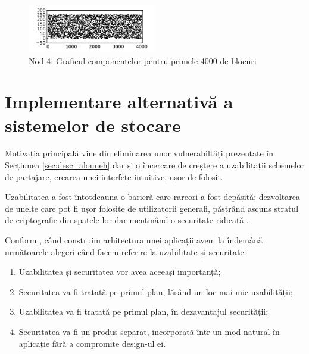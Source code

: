\documentclass[oneside, 12pt]{book}
\begin{document}
\begin{figure}[t!]
\begin{center}
\includegraphics[width=0.5\textwidth]{img/carouri_db4_c.png}    %
\caption{Nod 4: Graficul componentelor pentru primele 4000 de blocuri} 
\label{fig:carouri_db4_c}
\end{center}
\end{figure}





\chapter{Implementare alternativă a sistemelor de stocare}
\label{cha:alternave-implementations}


Motivația principală vine din eliminarea unor vulnerabiltăți prezentate în Secțiunea  \ref{sec:desc_alouneh} dar și o încercare de creștere a uzabilității schemelor de partajare, crearea unei interfețe intuitive, ușor de folosit.

Uzabilitatea a fost întotdeauna o barieră care rareori a fost depășită; dezvoltarea de unelte care pot fi ușor folosite de utilizatorii generali, păstrând ascuns stratul de criptografie din spatele lor dar menținând o securitate ridicată \cite{gutmann:2005security}.

Conform \cite{gutmann:2005security}, când construim arhitectura unei aplicații avem la îndemână următoarele alegeri când facem referire la uzabilitate și securitate:

\begin{enumerate}
\item Uzabilitatea și securitatea vor avea aceeași importanță; 
\item Securitatea va fi tratată pe primul plan, lăsând un loc mai mic uzabilității;
\item Uzabilitatea va fi tratată pe primul plan, în dezavantajul securității;
\item Securitatea va fi un produs separat, incorporată într-un mod natural în aplicație fără a compromite design-ul ei.
\end{enumerate}
\end{document}
